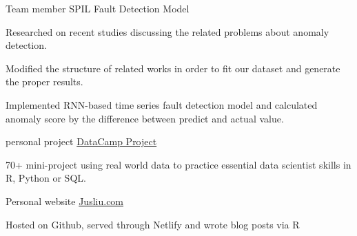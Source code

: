 

\begin{cventries}

  \cventry
    {Team member}
    {SPIL Fault Detection Model}
    {}
    {}
    {
    \begin{cvitems} %
        \item {Researched on recent studies discussing the related problems about anomaly detection.}
        \item {Modified the structure of related works in order to fit our dataset and generate the proper results.}
        \item {Implemented RNN-based time series fault detection model and calculated anomaly score by the difference between predict and actual value.}
      \end{cvitems}
    }

  \cventry
    {personal project} %
    {\href{https://github.com/jusliu9547/DataCamp_project}{DataCamp Project}} %
    {} %
    {} %
    {
      \begin{cvitems} %
        \item {70+ mini-project using real world data to practice essential data scientist skills in R, Python or SQL.}
      \end{cvitems}
    }
  \cventry
    {Personal website} %
    {\href{https://github.com/jusliu9547/jusliu.com}{Jusliu.com}} %
    {} %
    {} %
    {
      \begin{cvitems} %
        \item {Hosted on Github, served through Netlify and wrote blog posts via R}
      \end{cvitems}
    }
\end{cventries}

